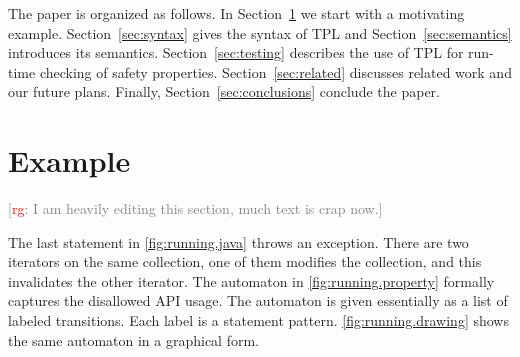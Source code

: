 \documentclass[preprint]{sigplanconf} %
\newcommand{\note}[2]{\textcolor{gray}{[\textcolor{red}{#1}: #2]}}
\newcommand{\rg}[1]{\note{rg}{#1}}
\theoremstyle{definition}
\begin{document}

The paper is organized as follows. In Section~\ref{sec:example} we start with a motivating example. 
Section~\ref{sec:syntax} gives the syntax of TPL and Section~\ref{sec:semantics} introduces its semantics. 
Section~\ref{sec:testing} describes the use of TPL for run-time checking of safety properties. 
Section~\ref{sec:related} discusses related work and our future plans. 
Finally, Section~\ref{sec:conclusions} conclude the paper.
\section{Example}\label{sec:example} %

\rg{I am heavily editing this section, much text is crap now.}

The last statement in \autoref{fig:running.java} throws an exception.
There are two iterators on the same collection, one of them modifies the collection, and this invalidates the other iterator.
The automaton in \autoref{fig:running.property} formally captures the disallowed API usage.
The automaton is given essentially as a list of labeled transitions.
Each label is a statement pattern.
\autoref{fig:running.drawing} shows the same automaton in a graphical form.
\end{document}

